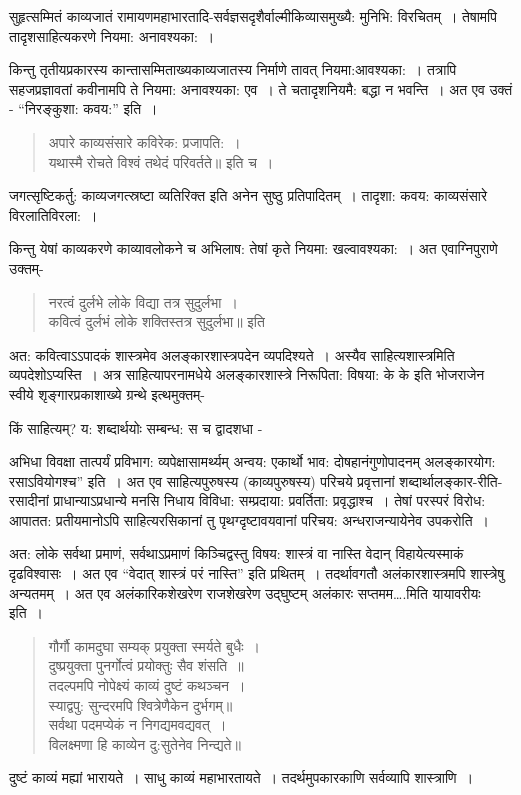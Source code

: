 {सुहृत्सम्मितं काव्यजातं रामायणमहाभारतादि-सर्वज्ञसदृशैर्वाल्मीकिव्यासमुख्यै: मुनिभि: विरचितम्~। तेषामपि तादृशसाहित्यकरणे नियमा: अनावश्यका:~। 

किन्तु तृतीयप्रकारस्य कान्तासम्मिताख्यकाव्यजातस्य निर्माणे तावत् नियमा:\break आवश्यका:~। तत्रापि सहजप्रज्ञावतां कवीनामपि ते नियमा: अनावश्यका: एव~। ते च\break तादृशनियमै: बद्धा न भवन्ति~।  अत एव उक्तं - “निरङ्कुशा: कवय:” इति~। 
\begin{verse}
अपारे काव्यसंसारे कविरेक: प्रजापति:~। \\
यथास्मै रोचते विश्वं तथेदं परिवर्तते॥ इति च~। 
\end{verse}
जगत्सृष्टिकर्तु: काव्यजगत्स्रष्टा व्यतिरिक्त इति अनेन सुष्ठु प्रतिपादितम्~। तादृशा: कवय: काव्यसंसारे विरलातिविरला:~। 

किन्तु येषां काव्यकरणे काव्यावलोकने च अभिलाष: तेषां कृते नियमा: खल्वावश्यका:~। अत एवाग्निपुराणे उक्तम्-
\begin{verse}
नरत्वं दुर्लभे लोके विद्या तत्र सुदुर्लभा~। \\
कवित्वं दुर्लभं लोके शक्तिस्तत्र सुदुर्लभा॥ इति
\end{verse}
अत: कवित्वाऽऽपादकं शास्त्रमेव अलङ्कारशास्त्रपदेन व्यपदिश्यते~। अस्यैव साहित्य\-शास्त्रमिति व्यपदेशोऽप्यस्ति~। अत्र साहित्यापरनामधेये अलङ्कारशास्त्रे निरूपिता: विषया: के के इति भोजराजेन स्वीये शृङ्गारप्रकाशाख्ये ग्रन्थे इत्थमुक्तम्-

किं साहित्यम्? य: शब्दार्थयोः सम्बन्ध: स च द्वादशधा -

अभिधा विवक्षा तात्पर्यं प्रविभाग: व्यपेक्षासामर्थ्यम् अन्वय: एकार्थो भाव: दोषहानं\break गुणोपादनम् अलङ्कारयोग: रसाऽवियोगश्च” इति~। अत एव साहित्यपुरुषस्य (काव्य\-पुरुषस्य) परिचये प्रवृत्तानां शब्दार्थालङ्कार-रीति-रसादीनां प्राधान्याऽप्रधान्ये मनसि निधाय विविधा: सम्प्रदाया: प्रवर्तिता: प्रवृद्धाश्च~। तेषां परस्परं विरोध: आपातत: प्रतीयमानोऽपि साहित्यरसिकानां तु पृथग्दृष्टावयवानां  परिचय: अन्धराजन्यायेनेव उपकरोति~। 

अत: लोके सर्वथा प्रमाणं, सर्वथाऽप्रमाणं किञ्चिद्वस्तु विषय: शास्त्रं वा नास्ति वेदान् विहायेत्यस्माकं दृढविश्वासः~। अत एव “वेदात् शास्त्रं परं नास्ति” इति प्रथितम्~। तदर्थावगतौ अलंकारशास्त्रमपि शास्त्रेषु अन्यतमम्~। अत एव अलंकारिकशेखरेण राजशेखरेण उद्घुष्टम् अलंकारः सप्तमम….मिति यायावरीयः इति~।
\begin{verse}
गौर्गौ कामदुघा सम्यक् प्रयुक्ता स्मर्यते बुधैः~। \\
दुष्प्रयुक्ता पुनर्गोत्वं प्रयोक्तुः सैव शंसति~॥\\
तदल्पमपि नोपेक्ष्यं काव्यं दुष्टं कथञ्चन~। \\
स्याद्वपु: सुन्दरमपि श्वित्रेणैकेन दुर्भगम्॥\\
सर्वथा पदमप्येकं न निगद्यमवद्यवत्~। \\
विलक्ष्मणा हि काव्येन दु:सुतेनेव निन्द्यते॥
\end{verse}
दुष्टं काव्यं मह्यां भारायते~। साधु काव्यं महाभारतायते~। तदर्थमुपकारकाणि सर्वव्यापि शास्त्राणि~। 

}
